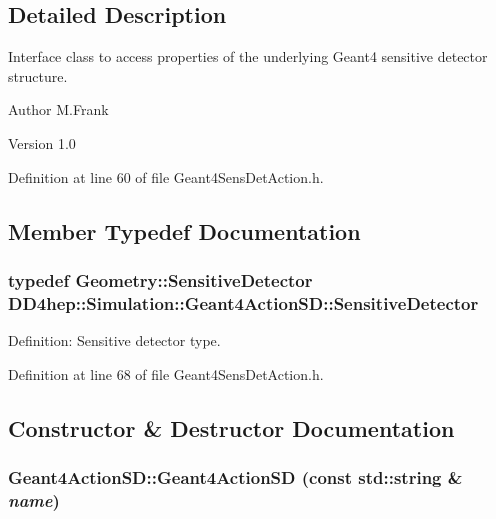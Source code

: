 \subsection{Detailed Description}
Interface class to access properties of the underlying Geant4 sensitive detector structure. \begin{DoxyAuthor}{Author}
M.Frank 
\end{DoxyAuthor}
\begin{DoxyVersion}{Version}
1.0 
\end{DoxyVersion}


Definition at line 60 of file Geant4SensDetAction.h.

\subsection{Member Typedef Documentation}
\hypertarget{class_d_d4hep_1_1_simulation_1_1_geant4_action_s_d_a8a292947ea3f9b419728ef729a7e3fae}{
\subsubsection[{SensitiveDetector}]{\setlength{\rightskip}{0pt plus 5cm}typedef {\bf Geometry::SensitiveDetector} {\bf DD4hep::Simulation::Geant4ActionSD::SensitiveDetector}}}
\label{class_d_d4hep_1_1_simulation_1_1_geant4_action_s_d_a8a292947ea3f9b419728ef729a7e3fae}


Definition: Sensitive detector type. 

Definition at line 68 of file Geant4SensDetAction.h.

\subsection{Constructor \& Destructor Documentation}
\hypertarget{class_d_d4hep_1_1_simulation_1_1_geant4_action_s_d_ad09cff29caa01d794981f342c0b1632e}{
\subsubsection[{Geant4ActionSD}]{\setlength{\rightskip}{0pt plus 5cm}Geant4ActionSD::Geant4ActionSD (const std::string \& {\em name})}}
\label{class_d_d4hep_1_1_simulation_1_1_geant4_action_s_d_ad09cff29caa01d794981f342c0b1632e}



